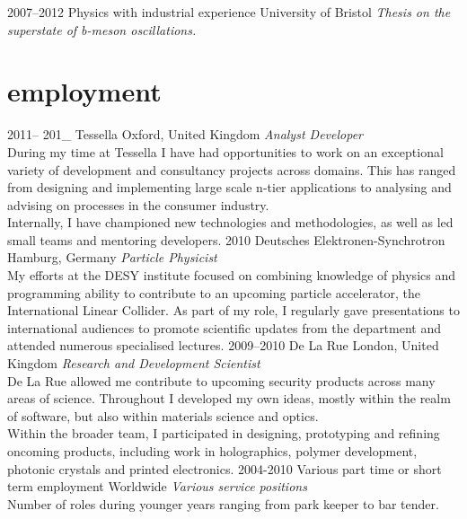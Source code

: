 \documentclass[]{friggeri-cv} %
\begin{document}
\begin{entrylist}
\entry
{2007--2012}
{Physics {\normalfont with industrial experience}}
{University of Bristol}
{\emph{Thesis on the superstate of b-meson oscillations.} }
\end{entrylist}


\section{employment}

\begin{entrylist}
\entry
{2011-- 201\_ }
{Tessella}
{Oxford, United Kingdom}
{\emph{Analyst Developer} \\
During my time at Tessella I have had opportunities to work on an exceptional variety of development and consultancy projects across domains. This has ranged from designing and implementing large scale n-tier applications to analysing and advising on processes in the consumer industry.\\
Internally, I have championed new technologies and methodologies, as well as led small teams and mentoring developers.} 
\entry
{2010}
{Deutsches Elektronen-Synchrotron}
{Hamburg, Germany}
{\emph{Particle Physicist} \\
My efforts at the DESY institute focused on combining knowledge of physics and programming ability to contribute to an upcoming particle accelerator, the International Linear Collider. As part of my role, I regularly gave presentations to international audiences to promote scientific updates from the department and attended numerous specialised lectures.} 
\entry
{2009--2010}
{De La Rue}
{London, United Kingdom}
{\emph{Research and Development Scientist} \\
De La Rue allowed me contribute to upcoming security
products across many areas of science. Throughout I developed my own ideas, mostly within the realm of software, but also within materials science and optics. \\
Within the broader team, I participated in designing, prototyping and refining oncoming products, including work in holographics, polymer development, photonic crystals and printed electronics. }
\entry
{2004-2010}
{Various part time or short term employment}
{Worldwide}
{\emph{Various service positions} \\
Number of roles during younger years ranging from park keeper to bar tender.}
\end{entrylist}
\end{document}
